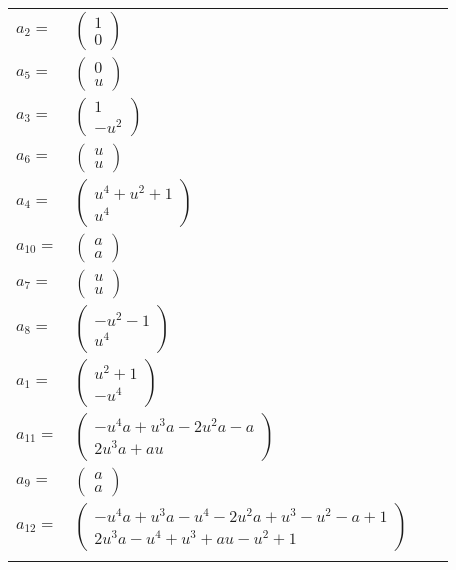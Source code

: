 \documentclass[1p]{elsarticle_modified}
\theoremstyle{definition}
\begin{document}
\begin{tabular}{m{7pt} m{180pt} m{7pt} m{180pt} }
\flushright $a_{2}=$&$\begin{pmatrix}1\\0\end{pmatrix}$ \\
\flushright $a_{5}=$&$\begin{pmatrix}0\\u\end{pmatrix}$ \\
\flushright $a_{3}=$&$\begin{pmatrix}1\\- u^2\end{pmatrix}$ \\
\flushright $a_{6}=$&$\begin{pmatrix}u\\u\end{pmatrix}$ \\
\flushright $a_{4}=$&$\begin{pmatrix}u^4+u^2+1\\u^4\end{pmatrix}$ \\
\flushright $a_{10}=$&$\begin{pmatrix}a\\a\end{pmatrix}$ \\
\flushright $a_{7}=$&$\begin{pmatrix}u\\u\end{pmatrix}$ \\
\flushright $a_{8}=$&$\begin{pmatrix}- u^2-1\\u^4\end{pmatrix}$ \\
\flushright $a_{1}=$&$\begin{pmatrix}u^2+1\\- u^4\end{pmatrix}$ \\
\flushright $a_{11}=$&$\begin{pmatrix}- u^4 a+u^3 a-2 u^2 a- a\\2 u^3 a+a u\end{pmatrix}$ \\
\flushright $a_{9}=$&$\begin{pmatrix}a\\a\end{pmatrix}$ \\
\flushright $a_{12}=$&$\begin{pmatrix}- u^4 a+u^3 a- u^4-2 u^2 a+u^3- u^2- a+1\\2 u^3 a- u^4+u^3+a u- u^2+1\end{pmatrix}$\\&\end{tabular}
\end{document}
